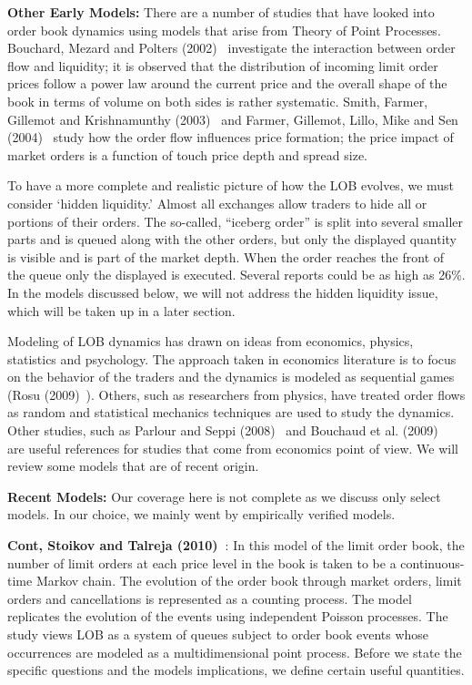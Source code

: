 \noindent \textbf{Other Early Models:} There are a number of studies that have looked into order book dynamics using models that arise from Theory of Point Processes. Bouchard, Mezard and Polters (2002)~\cite{bouchardmezard} investigate the interaction between order flow and liquidity; it is observed that the distribution of incoming limit order prices follow a power law around the current price and the overall shape of the book in terms of volume on both sides is rather systematic. Smith, Farmer, Gillemot and Krishnamunthy (2003)~\cite{smithfarm} and Farmer, Gillemot, Lillo, Mike and Sen (2004)~\cite{farmermikesen} study how the order flow influences price formation; the price impact of market orders is a function of touch price depth and spread size. 


To have a more complete and realistic picture of how the LOB evolves, we must consider `hidden liquidity.' Almost all exchanges allow traders to hide all or portions of their orders. The so-called, ``iceberg order'' is split into several smaller parts and is queued along with the other orders, but only the displayed quantity is visible and is part of the market depth. When the order reaches the front of the queue only the displayed is executed. Several reports could be as high as 26\%. In the models discussed below, we will not address the hidden liquidity issue, which will be taken up in a later section.


Modeling of LOB dynamics has drawn on ideas from economics, physics, statistics and psychology. The approach taken in economics literature is to focus on the behavior of the traders and the dynamics is modeled as sequential games (Rosu (2009)~\cite{irosu09}). Others, such as researchers from physics, have treated order flows as random and statistical mechanics techniques are used to study the dynamics. Other studies, such as Parlour and Seppi (2008)~\cite{parseppi} and Bouchaud et al. (2009)~\cite{bouchaud2009} are useful references for studies that come from economics point of view. We will review some models that are of recent origin. \twomedskip



\noindent\textbf{Recent Models:} Our coverage here is not complete as we discuss only select models. In our choice, we mainly went by empirically verified models. \twomedskip


\noindent\textbf{Cont, Stoikov and Talreja (2010)~\cite{contstoi}}: In this model of the limit order book, the number of limit orders at each price level in the book is taken to be a continuous-time Markov chain. The evolution of the order book through market orders, limit orders and cancellations is represented as a counting process. The model replicates the evolution of the events using independent Poisson processes. The study views LOB as a system of queues subject to order book events whose occurrences are modeled as a multidimensional point process. Before we state the specific questions and the models implications, we define certain useful quantities. 


